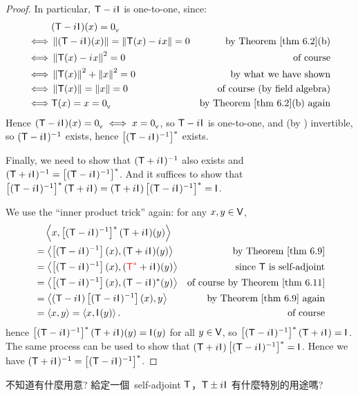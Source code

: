 \begin{proof}
In particular, \(\textsf{T} - {i\mkern1mu} \textsf{I}_{_{}}\) is one-to-one, since:
\begin{align*}
         & (\T - \iu \ITRAN{}) (x) = \OV \\
    \iff & \norm{(\T - \iu \ITRAN{})(x)} = \norm{\T(x) - \iu x} = 0 & \text{by \THM{6.2}(b)} \\
    \iff & \norm{\T(x) - \iu x}^2 = 0 & \text{of course} \\
    \iff & \norm{\T(x)}^2 + \norm{x}^2 = 0 & \text{by what we have shown} \\
    \iff & \norm{\T(x)} = \norm{x} = 0 & \text{of course (by field algebra)} \\
    \iff & \T(x) = x = \OV & \text{by \THM{6.2}(b) again}
\end{align*}
Hence \((\textsf{T} - {i\mkern1mu} \textsf{I}_{_{}}) (x) = 0_{_{\textsf{V}}} \iff x = 0_{_{\textsf{V}}}\), so \(\textsf{T} - {i\mkern1mu} \textsf{I}_{_{}}\) is one-to-one, and  (by ) invertible, so \((\textsf{T} - {i\mkern1mu} \textsf{I}_{_{}})^{-1}\) exists, hence \(\left[ (\textsf{T} - {i\mkern1mu} \textsf{I}_{_{}})^{-1} \right]^*\) exists.

Finally, we need to show that \((\textsf{T} + {i\mkern1mu} \textsf{I}_{_{}})^{-1}\) also exists and \((\textsf{T} + {i\mkern1mu} \textsf{I}_{_{}})^{-1} = \left[ (\textsf{T} - {i\mkern1mu} \textsf{I}_{_{}})^{-1} \right]^*\).
And it suffices to show that \(\left[ (\textsf{T} - {i\mkern1mu} \textsf{I}_{_{}})^{-1} \right]^* (\textsf{T} + {i\mkern1mu} \textsf{I}_{_{}}) = (\textsf{T} + {i\mkern1mu} \textsf{I}_{_{}}) \left[ (\textsf{T} - {i\mkern1mu} \textsf{I}_{_{}})^{-1} \right]^* = \textsf{I}_{_{}}\).

We use the ``inner product trick'' again: for any \(x, y \in \textsf{V}\),
\begin{align*}
    & \quad \LG x, \left[ (\T - \iu \ITRAN{})^{-1} \right]^* (\T + \iu \ITRAN{}) (y) \RG \\
    & = \LG \left[ (\T - \iu \ITRAN{})^{-1} \right](x), (\T + \iu \ITRAN{}) (y) \RG & \text{by \THM{6.9}} \\
    & = \LG \left[ (\T - \iu \ITRAN{})^{-1} \right](x), (\RED{\T^*} + \iu \ITRAN{}) (y) \RG & \text{since \(\T\) is self-adjoint} \\
    & = \LG \left[ (\T - \iu \ITRAN{})^{-1} \right](x), (\T - \iu \ITRAN{})^* (y) \RG & \text{of course by \THM{6.11}} \\
    & = \LG (\T - \iu \ITRAN{}) \left[ (\T - \iu \ITRAN{})^{-1} \right](x), y \RG & \text{by \THM{6.9} again} \\
    & = \LG x, y \RG = \LG x, \ITRAN{}(y) \RG. & \text{of course}
\end{align*}
hence \(\left[ (\textsf{T} - {i\mkern1mu} \textsf{I}_{_{}})^{-1} \right]^* (\textsf{T} + {i\mkern1mu} \textsf{I}_{_{}}) (y) = \textsf{I}_{_{}}(y)\) for all \(y \in \textsf{V}\), so \(\left[ (\textsf{T} - {i\mkern1mu} \textsf{I}_{_{}})^{-1} \right]^* (\textsf{T} + {i\mkern1mu} \textsf{I}_{_{}}) = \textsf{I}_{_{}}\).
The same process can be used to show that \((\textsf{T} + {i\mkern1mu} \textsf{I}_{_{}}) \left[ (\textsf{T} - {i\mkern1mu} \textsf{I}_{_{}})^{-1} \right]^* = \textsf{I}_{_{}}\).
Hence we have \((\textsf{T} + {i\mkern1mu} \textsf{I}_{_{}})^{-1} = \left[ (\textsf{T} - {i\mkern1mu} \textsf{I}_{_{}})^{-1} \right]^*\).
\end{proof}
\begin{note}
 不知道有什麼用意? 給定一個\ self-adjoint \(\textsf{T}\)，\(\textsf{T} \pm {i\mkern1mu} \textsf{I}_{_{}}\) 有什麼特別的用途嗎?
\end{note}

